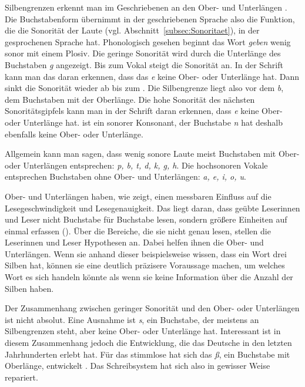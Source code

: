Silbengrenzen erkennt man im Geschriebenen  an den Ober- und Unterlängen \citep[217--221]{FuhrhopPeters2013}. Die Buchstabenform übernimmt in der geschriebenen Sprache also die Funktion, die die Sonorität der Laute (vgl. Abschnitt~\ref{subsec:Sonoritaet}), in der gesprochenen Sprache hat. Phonologisch gesehen beginnt das Wort \textit{geben} wenig sonor mit einem Plosiv. Die geringe Sonorität wird durch die Unterlänge des Buchstaben \textit{g} angezeigt. Bis zum Vokal \textipa{[e:]} steigt die Sonorität an. In der Schrift kann man das daran erkennen, dass das \textit{e} keine Ober- oder Unterlänge hat. Dann sinkt die Sonorität wieder ab bis zum \textipa{[b]}. Die Silbengrenze liegt also vor dem \textit{b}, dem Buchstaben mit der Oberlänge. Die hohe Sonorität des nächsten Sonoritätsgipfels kann man in der Schrift daran erkennen, dass \textit{e} keine Ober- oder Unterlänge hat. \textipa{[n]} ist ein sonorer Konsonant, der Buchstabe \textit{n} hat deshalb ebenfalls keine Ober- oder Unterlänge.

Allgemein kann man sagen, dass wenig sonore Laute meist Buchstaben mit Ober- oder Unterlängen entsprechen: \textit{p, b, t, d, k, g, h}. Die hochsonoren Vokale entsprechen Buchstaben ohne Ober- und Unterlängen: \textit{a, e, i, o, u}. 

Ober- und Unterlängen haben, wie \citet{Drews2011} zeigt, einen messbaren Einfluss auf die Lesegeschwindigkeit und Lesegenauigkeit. Das liegt daran, dass geübte Leserinnen und Leser nicht Buchstabe für Buchstabe lesen, sondern größere Einheiten auf einmal erfassen (\zB \cite{Scheerer-Neumann1998}). Über die Bereiche, die sie nicht genau lesen, stellen die Leserinnen und Leser Hypothesen an. Dabei helfen ihnen die Ober- und Unterlängen. Wenn sie anhand dieser beispielsweise wissen, dass ein Wort drei Silben hat, können sie eine deutlich präzisere Voraussage machen, um welches Wort es sich handeln könnte als wenn sie keine Information über die Anzahl der Silben haben.

Der Zusammenhang zwischen geringer Sonorität und den Ober- oder Unterlängen ist nicht absolut. Eine Ausnahme ist \textit{s}, ein Buchstabe, der meistens an Silbengrenzen steht, aber keine Ober- oder Unterlänge hat. Interessant ist in diesem Zusammenhang jedoch die Entwicklung, die das Deutsche in den letzten Jahrhunderten erlebt hat. Für das stimmlose \textipa{[s]} hat sich das \textit{ß}, ein Buchstabe mit Oberlänge, entwickelt \citep[199--200]{FuhrhopPeters2013}. Das Schreibsystem hat sich also in gewisser Weise repariert.

